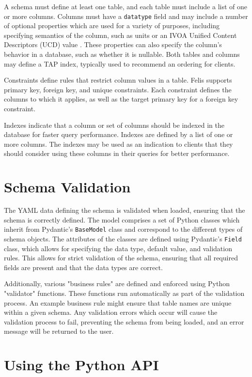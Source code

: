 \documentclass[11pt,twoside]{article}
\begin{document}
A schema must define at least one table, and each table must include a list of one or more columns.
Columns must have a \texttt{datatype} field and may include a number of optional properties which are used for a variety of purposes, including specifying semantics of the column, such as units or an IVOA Unified Content Descriptors (UCD) value \citep{2023ivoa.spec.0125C}.
These properties can also specify the column's behavior in a database, such as whether it is nullable.
Both tables and columns may define a TAP index, typically used to recommend an ordering for clients.

Constraints define rules that restrict column values in a table.
Felis supports primary key, foreign key, and unique constraints.
Each constraint defines the columns to which it applies, as well as the target primary key for a foreign key constraint.

Indexes indicate that a column or set of columns should be indexed in the database for faster query performance.
Indexes are defined by a list of one or more columns.
The indexes may be used as an indication to clients that they should consider using these columns in their queries for better performance.

\section{Schema Validation}
The YAML data defining the schema is validated when loaded, ensuring that the schema is correctly defined.
The model comprises a set of Python classes which inherit from Pydantic's \texttt{BaseModel} class and correspond to the different types of schema objects.
The attributes of the classes are defined using Pydantic's \texttt{Field} class, which allows for specifying the data type, default value, and validation rules.
This allows for strict validation of the schema, ensuring that all required fields are present and that the data types are correct.

Additionally, various "business rules" are defined and enforced using Python "validator" functions.
These functions run automatically as part of the validation process.
An example business rule might ensure that table names are unique within a given schema.
Any validation errors which occur will cause the validation process to fail, preventing the schema from being loaded, and an error message will be returned to the user.

\section{Using the Python API}
\end{document}
